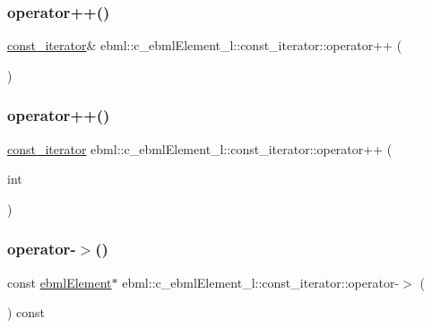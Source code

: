 \subsubsection{\texorpdfstring{operator++()}{operator++()}\hspace{0.1cm}{\footnotesize\ttfamily [1/2]}}
{\footnotesize\ttfamily \mbox{\hyperlink{classebml_1_1c__ebmlElement__l_1_1const__iterator}{const\+\_\+iterator}}\& ebml\+::c\+\_\+ebml\+Element\+\_\+l\+::const\+\_\+iterator\+::operator++ (\begin{DoxyParamCaption}{ }\end{DoxyParamCaption})}

\mbox{\label{classebml_1_1c__ebmlElement__l_1_1const__iterator_ae22cfcee1250e01aea94976ea70fb59b}} 
\subsubsection{\texorpdfstring{operator++()}{operator++()}\hspace{0.1cm}{\footnotesize\ttfamily [2/2]}}
{\footnotesize\ttfamily \mbox{\hyperlink{classebml_1_1c__ebmlElement__l_1_1const__iterator}{const\+\_\+iterator}} ebml\+::c\+\_\+ebml\+Element\+\_\+l\+::const\+\_\+iterator\+::operator++ (\begin{DoxyParamCaption}\item[{int}]{ }\end{DoxyParamCaption})}

\mbox{\label{classebml_1_1c__ebmlElement__l_1_1const__iterator_a8e9cc0f60248685efff94c6fe0c33be1}} 
\subsubsection{\texorpdfstring{operator-\/$>$()}{operator->()}}
{\footnotesize\ttfamily const \mbox{\hyperlink{classebml_1_1ebmlElement}{ebml\+Element}}$\ast$ ebml\+::c\+\_\+ebml\+Element\+\_\+l\+::const\+\_\+iterator\+::operator-\/$>$ (\begin{DoxyParamCaption}{ }\end{DoxyParamCaption}) const}

